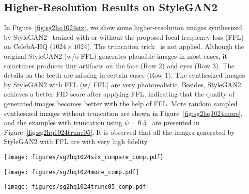 \documentclass[10pt,twocolumn,letterpaper]{article}
\begin{document}
\subsection{Higher-Resolution Results on StyleGAN2}
\label{sec:moreexamples}

In Figure~\ref{fig:sg2hq1024six}, we show some higher-resolution images synthesized by StyleGAN2~\cite{stylegan2} trained with or without the proposed focal frequency loss (FFL) on CelebA-HQ ($1024 \times 1024$). The truncation trick~\cite{stylegan,stylegan2} is not applied.
Although the original StyleGAN2 (w/o FFL) generates plausible images in most cases, it sometimes produces tiny artifacts on the face (Row $2$) and eyes (Row $3$). The details on the teeth are missing in certain cases (Row $1$). The synthesized images by StyleGAN2 with FFL (w/ FFL) are very photorealistic. Besides, StyleGAN2 achieves a better FID score after applying FFL, indicating that the quality of generated images becomes better with the help of FFL.
More random sampled synthesized images without truncation are shown in Figure~\ref{fig:sg2hq1024more}, and the examples with truncation using $\psi=0.5$~\cite{stylegan,stylegan2} are presented in Figure~\ref{fig:sg2hq1024trunc05}. It is observed that all the images generated by StyleGAN2 with FFL are with very high fidelity.


\begin{figure*}[t]
	\centering
\texttt{[image: figures/sg2hq1024six\_compare\_comp.pdf]}
\caption{Synthesis results (without truncation) of StyleGAN2 trained with/without the proposed FFL on CelebA-HQ ($1024 \times 1024$). The model with FFL achieves the FID score of $\bf3.374$, outperforming the original StyleGAN2 without FFL of $3.733$.}
	\label{fig:sg2hq1024six}
\end{figure*}


\begin{figure*}[t]
	\centering
\texttt{[image: figures/sg2hq1024more\_comp.pdf]}
\caption{More random sampled images (without truncation) synthesized by StyleGAN2 trained with the proposed FFL on CelebA-HQ ($1024 \times 1024$).}
	\label{fig:sg2hq1024more}
\end{figure*}


\begin{figure*}[t]
	\centering
\texttt{[image: figures/sg2hq1024trunc05\_comp.pdf]}
\caption{More random sampled images (with truncation applied using $\psi=0.5$~\cite{stylegan,stylegan2}) synthesized by StyleGAN2 trained with the proposed FFL on CelebA-HQ ($1024 \times 1024$).}
	\label{fig:sg2hq1024trunc05}
\end{figure*}
 
\end{document}
